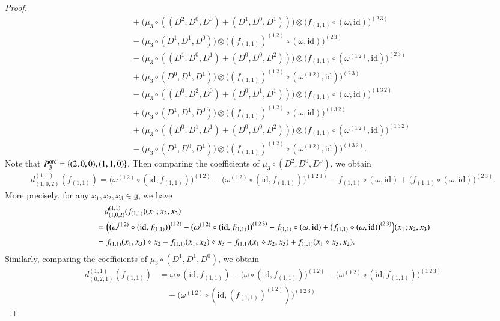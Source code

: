 \documentclass[12pt]{amsart}
\theoremstyle{definition}
\newcommand{\g}{\mathfrak g}
\newcommand{\id}{\mathrm{id}}
\newcommand{\ot}{\otimes}
\newcommand{\ord}{{\rm ord}}
\newcommand{\ff}{f_{(1,1)}}
\begin{document}
\begin{proof}
\begin{align*}
	&\quad+\bigl(\mu_3\circ((D^2,D^0,D^0)+(D^1,D^0,D^1))\bigr)\ot\bigl(\ff\circ(\omega,\id)\bigr)^{(2\,3)}\\
	&\quad-\bigl(\mu_3\circ(D^1,D^1,D^0)\bigr)\ot\bigl((\ff)^{(1\,2)}\circ(\omega,\id)\bigr)^{(2\,3)}\\
	&\quad-\bigl(\mu_3\circ((D^1,D^0,D^1)+(D^0,D^0,D^2))\bigr)\ot\bigl(\ff\circ(\omega^{(1\,2)},\id)\bigr)^{(2\,3)}\\
	&\quad+\bigl(\mu_3\circ(D^0,D^1,D^1)\bigr)\ot\bigl((\ff)^{(1\,2)}\circ(\omega^{(1\,2)},\id)\bigr)^{(2\,3)}\\
	&\quad-\bigl(\mu_3\circ((D^0,D^2,D^0)+(D^0,D^1,D^1))\bigr)\ot\bigl(\ff\circ(\omega,\id)\bigr)^{(1\,3\,2)}\\
	&\quad+\bigl(\mu_3\circ(D^1,D^1,D^0)\bigr)\ot\bigl((\ff)^{(1\,2)}\circ(\omega,\id)\bigr)^{(1\,3\,2)}\\
	&\quad+\bigl(\mu_3\circ((D^0,D^1,D^1)+(D^0,D^0,D^2))\bigr)\ot\bigl(\ff\circ(\omega^{(1\,2)},\id)\bigr)^{(1\,3\,2)}\\
	&\quad-\bigl(\mu_3\circ(D^1,D^0,D^1)\bigr)\ot\bigl((\ff)^{(1\,2)}\circ(\omega^{(1\,2)},\id)\bigr)^{(1\,3\,2)}.
\end{align*}
Note that $P_3^{\ord}=\{(2,0,0),(1,1,0)\}$. Then comparing the coefficients of $\mu_3\circ(D^2,D^0,D^0)$, we obtain
\begin{align*}
d_{(1,0,2)}^{(1,1)}(f_{(1,1)})=	\bigl(\omega^{(1\,2)}\circ(\id,\ff)\bigr)^{(1\,2)}-\bigl(\omega^{(1\,2)}\circ(\id,\ff)\bigr)^{(1\,2\,3)}-\ff\circ(\omega,\id)+\bigl(\ff\circ(\omega,\id)\bigr)^{(2\,3)}.
\end{align*}
More precisely, for any $x_1,x_2,x_3\in\g$, we have
\begin{align*}
	&\quad d_{(1,0,2)}^{(1,1)}(f_{(1,1)})(x_1;x_2,x_3)\\
	&=\Bigl(\bigl(\omega^{(1\,2)}\circ(\id,\ff)\bigr)^{(1\,2)}-\bigl(\omega^{(1\,2)}\circ(\id,\ff)\bigr)^{(1\,2\,3)}
	-\ff\circ(\omega,\id)+\bigl(\ff\circ(\omega,\id)\bigr)^{(2\,3)}\Bigr)(x_1;x_2,x_3)\\
	&=\ff(x_1,x_3)\diamond x_2-\ff(x_1,x_2)\diamond x_3-\ff(x_1\diamond x_2,x_3)+\ff(x_1\diamond x_3,x_2).
\end{align*}
Similarly, comparing the coefficients of $\mu_3\circ(D^1,D^1,D^0)$, we obtain
\begin{align*}
	d_{(0,2,1)}^{(1,1)}(f_{(1,1)})&=\omega\circ (\id, f_{(1,1)})
	-\big(\omega\circ (\id, f_{(1,1)})\big)^{(1\,2)}
	-\bigl(\omega^{(1\,2)}\circ(\id,\ff)\bigr)^{(1\,2\,3)}
	\\
	&\quad+\bigl(\omega^{(1\,2)}\circ(\id,(\ff)^{(1\,2)} )\bigr)^{(1\,2\,3)}

\end{align*}
\end{proof}
\end{document}

